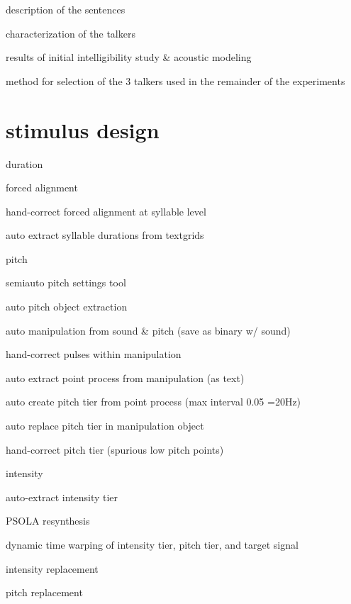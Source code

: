 \begin{itm}
	\item{description of the sentences}
	\item{characterization of the talkers}
	\item{results of initial intelligibility study \& acoustic modeling}
	\item{method for selection of the 3 talkers used in the remainder of the experiments}
\end{itm}


\section{stimulus design}
\begin{itm}
	\item{duration}
	\begin{itm}
		\item{forced alignment}
		\item{hand-correct forced alignment at syllable level}
		\item{auto extract syllable durations from textgrids}
	\end{itm}
	\item{pitch}
	\begin{itm}
		\item{semiauto pitch settings tool}
		\item{auto pitch object extraction}
		\item{auto manipulation from sound \& pitch (save as binary w/ sound)}
		\item{hand-correct pulses within manipulation}
		\item{auto extract point process from manipulation (as text)}
		\item{auto create pitch tier from point process (max interval 0.05 =20Hz)}
		\item{auto replace pitch tier in manipulation object}
		\item{hand-correct pitch tier (spurious low pitch points)}
	\end{itm}
	\item{intensity}
	\begin{itm}
		\item{auto-extract intensity tier}
	\end{itm}
	\item{PSOLA resynthesis}
	\begin{itm}
		\item{dynamic time warping of intensity tier, pitch tier, and target signal}
		\item{intensity replacement}
		\item{pitch replacement}
	\end{itm}	
\end{itm}


